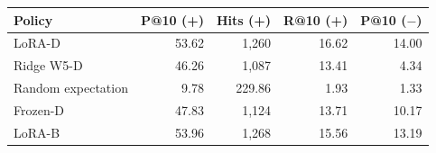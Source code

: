 {\small\setlength{\tabcolsep}{4pt}
\begin{tabularx}{\textwidth}{Xrrrr}
\toprule
Policy & P@10 (+) & Hits (+) & R@10 (+) & P@10 ($-$) \\
\midrule
LoRA-D & 53.62 & 1,260 & 16.62 & 14.00 \\
Ridge W5-D & 46.26 & 1,087 & 13.41 & 4.34 \\
Random expectation & 9.78 & 229.86 & 1.93 & 1.33 \\
Frozen-D & 47.83 & 1,124 & 13.71 & 10.17 \\
LoRA-B & 53.96 & 1,268 & 15.56 & 13.19 \\
\bottomrule
\end{tabularx}}
